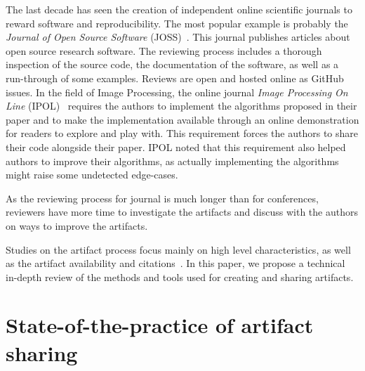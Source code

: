 \documentclass[sigconf,natbib=false]{acmart}
\newcommand{\ad}{Artifact Description}
\newcommand{\aeval}{Artifact Evaluation}
\newcommand{\adae}{\ad/\aeval}
\newcommand{\todo}[1]{{\color{red}{TODO: #1}}}
\begin{document}
The last decade has seen the creation of independent online scientific journals to reward software and reproducibility.
The most popular example is probably the \emph{Journal of Open Source Software} (JOSS)\ \cite{smith2018journal}.
This journal publishes articles about open source research software.
The reviewing process includes a thorough inspection of the source code, the documentation of the software, as well as a run-through of some examples.
Reviews are open and hosted online as GitHub issues.
In the field of Image Processing, the online journal \emph{Image Processing On Line} (IPOL)\ \cite{colom2015ipol} requires the authors to implement the algorithms proposed in their paper and to make the implementation available through an online demonstration for readers to explore and play with.
This requirement forces the authors to share their code alongside their paper.
IPOL noted that this requirement also helped authors to improve their algorithms, as actually implementing the algorithms might raise some undetected edge-cases.

As the reviewing process for journal is much longer than for conferences, reviewers have more time to investigate the artifacts and discuss with the authors on ways to improve the artifacts.



Studies on the artifact process focus mainly on high level characteristics, as well as the artifact availability and citations\ \cite{kidwell2016badges, rowhani2017incentives, winter2022retrospective, frachtenberg2022research, heumuller2020publish}. 
In this paper, we propose a technical in-depth review of the methods and tools used for creating and sharing artifacts.


%
%

%
\section{State-of-the-practice of artifact sharing}\label{sec:sop}
\end{document}
